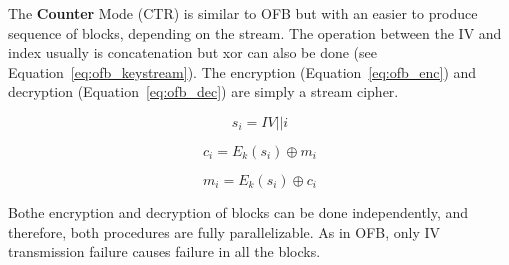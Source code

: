The \textbf{Counter} Mode (CTR) is similar to OFB but with an easier to produce sequence of blocks, depending on the stream.
The operation between the IV and index usually is concatenation but xor can also be done (see Equation~\ref{eq:ofb_keystream}).
The encryption (Equation~\ref{eq:ofb_enc}) and decryption (Equation~\ref{eq:ofb_dec}) are simply a stream cipher.

\begin{equation}
  s_i = IV || i
  \label{eq:ofb_keystream}
\end{equation}

\begin{equation}
  c_i = E_k(s_i) \oplus m_i
  \label{eq:ofb_enc}
\end{equation}

\begin{equation}
  m_i = E_k(s_i) \oplus c_i
  \label{eq:ofb_dec}
\end{equation}

Bothe encryption and decryption of blocks can be done independently, and therefore, both procedures are fully parallelizable.
As in OFB, only IV transmission failure causes failure in all the blocks.
